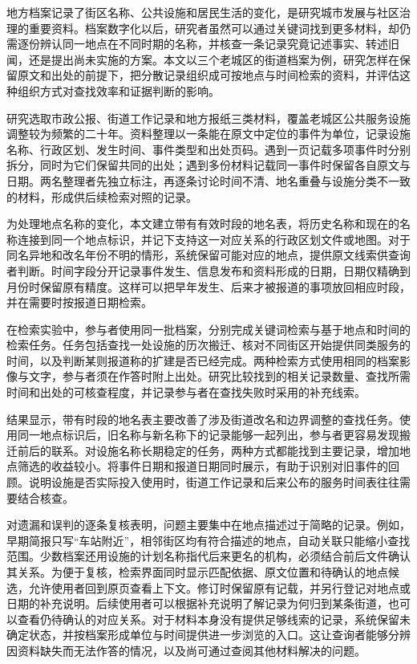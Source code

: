\begin{cabstract}

地方档案记录了街区名称、公共设施和居民生活的变化，是研究城市发展与社区治理的重要资料。档案数字化以后，研究者虽然可以通过关键词找到更多材料，却仍需逐份辨认同一地点在不同时期的名称，并核查一条记录究竟记述事实、转述旧闻，还是提出尚未实施的方案。本文以三个老城区的街道档案为例，研究怎样在保留原文和出处的前提下，把分散记录组织成可按地点与时间检索的资料，并评估这种组织方式对查找效率和证据判断的影响。

研究选取市政公报、街道工作记录和地方报纸三类材料，覆盖老城区公共服务设施调整较为频繁的二十年。资料整理以一条能在原文中定位的事件为单位，记录设施名称、行政区划、发生时间、事件类型和出处页码。遇到一页记载多项事件时分别拆分，同时为它们保留共同的出处；遇到多份材料记载同一事件时保留各自原文与日期。两名整理者先独立标注，再逐条讨论时间不清、地名重叠与设施分类不一致的材料，形成供后续检索对照的记录。

为处理地点名称的变化，本文建立带有有效时段的地名表，将历史名称和现在的名称连接到同一个地点标识，并记下支持这一对应关系的行政区划文件或地图。对于同名异地和改名年份不明的情形，系统保留可能对应的地点，提供原文线索供查询者判断。时间字段分开记录事件发生、信息发布和资料形成的日期，日期仅精确到月份时保留原有精度。这样可以把早年发生、后来才被报道的事项放回相应时段，并在需要时按报道日期检索。

在检索实验中，参与者使用同一批档案，分别完成关键词检索与基于地点和时间的检索任务。任务包括查找一处设施的历次搬迁、核对不同街区开始提供同类服务的时间，以及判断某则报道称的扩建是否已经完成。两种检索方式使用相同的档案影像与文字，参与者须在作答时附上出处。研究比较找到的相关记录数量、查找所需时间和出处的可核查程度，并记录参与者在查找失败时采用的补充线索。

结果显示，带有时段的地名表主要改善了涉及街道改名和边界调整的查找任务。使用同一地点标识后，旧名称与新名称下的记录能够一起列出，参与者更容易发现搬迁前后的联系。对设施名称长期稳定的任务，两种方式都能找到主要记录，增加地点筛选的收益较小。将事件日期和报道日期同时展示，有助于识别对旧事件的回顾。说明设施是否实际投入使用时，街道工作记录和后来公布的服务时间表往往需要结合核查。

对遗漏和误判的逐条复核表明，问题主要集中在地点描述过于简略的记录。例如，早期简报只写“车站附近”，相邻街区均有符合描述的地点，自动关联只能缩小查找范围。少数档案还用设施的计划名称指代后来更名的机构，必须结合前后文件确认其关系。为便于复核，检索界面同时显示匹配依据、原文位置和待确认的地点候选，允许使用者回到原页查看上下文。修订时保留原有记载，并另行登记对地点或日期的补充说明。后续使用者可以根据补充说明了解记录为何归到某条街道，也可以查看仍待确认的对应关系。对于材料本身没有提供足够线索的记录，系统保留未确定状态，并按档案形成单位与时间提供进一步浏览的入口。这让查询者能够分辨因资料缺失而无法作答的情况，以及尚可通过查阅其他材料解决的问题。


\end{cabstract}
